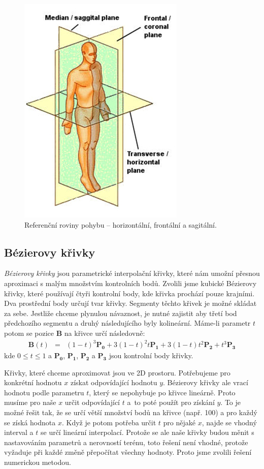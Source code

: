 \begin{figure}[h]
	\centering
	\includegraphics[width=0.35\linewidth]{fig/ref_planes.jpg}
	\caption{Referenční roviny pohybu -- horizontální, frontální a sagitální.\protect\footnotemark}
	\label{fig:ref_planes}
\end{figure}

\subsection{Bézierovy křivky}
\textit{Bézierovy křivky} \cite{bezier_primer} jsou parametrické interpolační křivky, které nám umožní přesnou aproximaci s malým množstvím kontrolních bodů. Zvolili jsme kubické Bézierovy křivky, které používají čtyři kontrolní body, kde křivka prochází pouze krajními. Dva prostřední body určují tvar křivky. Segmenty těchto křivek je možné skládat za sebe. Jestliže chceme plynulou návaznost, je nutné zajistit aby třetí bod předchozího segmentu a druhý následujícího byly kolineární. Máme-li parametr $t$ potom se pozice $\mathbf{B}$ na křivce určí následovně:
\begin{eqnarray}
\mathbf{B}(t) &=& (1 - t)^3\mathbf{P_0} + 3(1-t)^2 t\mathbf{P_1} + 3(1-t)t^2\mathbf{P_2} + t^3\mathbf{P_3}
\label{r.bezier}
\end{eqnarray}
kde $0 \leq t \leq 1$ a $\mathbf{P_0}$, $\mathbf{P_1}$, $\mathbf{P_2}$ a $\mathbf{P_3}$ jsou kontrolní body křivky.

Křivky, které chceme aproximovat jsou ve 2D prostoru. Potřebujeme pro konkrétní hodnotu $x$ získat odpovídající hodnotu $y$. Bézierovy křivky ale vrací hodnotu podle parametru $t$, který se nepohybuje po křivce lineárně. Proto musíme pro naše $x$ určit odpovídající $t$ a~to poté použít pro získání $y$. To je možné řešit tak, že se určí větší množství bodů na křivce (např. 100) a pro každý se získá hodnota $x$. Když je potom potřeba určit $t$ pro nějaké $x$, najde se vhodný interval a $t$ se určí lineární interpolací. Protože se ale naše křivky budou měnit s nastavováním parametrů a nerovností terénu, toto řešení není vhodné, protože vyžaduje při každé změně přepočítat všechny hodnoty. Proto jsme zvolili řešení numerickou metodou.

